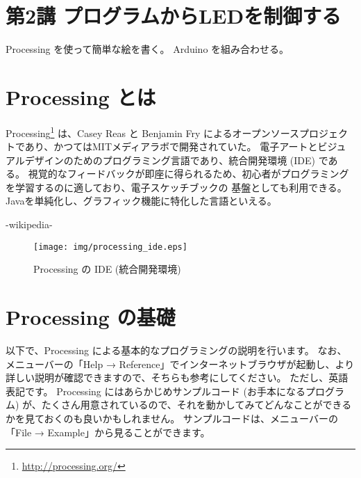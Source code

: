\documentclass[11pt,a4paper]{jarticle}
\begin{document}
\section*{\LARGE{第2講 プログラムからLEDを制御する}}
Processing を使って簡単な絵を書く。
 Arduino を組み合わせる。



\section{Processing とは}
Processing\footnote{\url{http://processing.org/}} は、Casey Reas と Benjamin Fry によるオープンソースプロジェクトであり、かつてはMITメディアラボで開発されていた。
電子アートとビジュアルデザインのためのプログラミング言語であり、統合開発環境 (IDE) である。 視覚的なフィードバックが即座に得られるため、初心者がプログラミングを学習するのに適しており、電子スケッチブックの
基盤としても利用できる。
Javaを単純化し、グラフィック機能に特化した言語といえる。

\begin{flushright}
 -wikipedia-
\end{flushright}


\begin{figure}[h]
 \centering
 \texttt{[image: img/processing\_ide.eps]}
 \caption{Processing の IDE (統合開発環境)}
\end{figure}


\section{Processing の基礎}
以下で、Processing による基本的なプログラミングの説明を行います。
なお、メニューバーの「Help → Reference」でインターネットブラウザが起動し、より詳しい説明が確認できますので、そちらも参考にしてください。
ただし、英語表記です。
Processing にはあらかじめサンプルコード (お手本になるプログラム) が、たくさん用意されているので、それを動かしてみてどんなことができるかを見ておくのも良いかもしれません。
サンプルコードは、メニューバーの「File → Example」から見ることができます。
\end{document}
